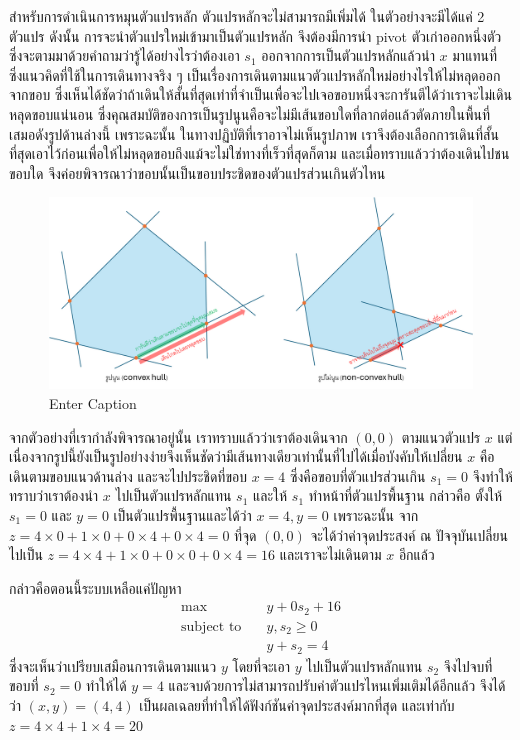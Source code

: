 สำหรับการดำเนินการหมุนตัวแปรหลัก ตัวแปรหลักจะไม่สามารถมีเพิ่มได้ ในตัวอย่างจะมีได้แค่ 2 ตัวแปร ดังนั้น การจะนำตัวแปรใหม่เข้ามาเป็นตัวแปรหลัก จึงต้องมีการนำ pivot ตัวเก่าออกหนึ่งตัว ซึ่งจะตามมาด้วยคำถามว่ารู้ได้อย่างไรว่าต้องเอา $s_1$ ออกจากการเป็นตัวแปรหลักแล้วนำ $x$ มาแทนที่
ซึ่งแนวคิดที่ใช้ในการเดินทางจริง ๆ เป็นเรื่องการเดินตามแนวตัวแปรหลักใหม่อย่างไรให้ไม่หลุดออกจากขอบ ซึ่งเห็นได้ชัดว่าถ้าเดินให้สั้นที่สุดเท่าที่จำเป็นเพื่อจะไปเจอขอบหนึ่งจะการันตีได้ว่าเราจะไม่เดินหลุดขอบแน่นอน ซึ่งคุณสมบัติของการเป็นรูปนูนคือจะไม่มีเส้นขอบใดที่ลากต่อแล้วตัดภายในพื้นที่เสมอดังรูปด้านล่างนี้
เพราะฉะนั้น ในทางปฏิบัติที่เราอาจไม่เห็นรูปภาพ เราจึงต้องเลือกการเดินที่สั้นที่สุดเอาไว้ก่อนเพื่อให้ไม่หลุดขอบถึงแม้จะไม่ใช่ทางที่เร็วที่สุดก็ตาม
และเมื่อทราบแล้วว่าต้องเดินไปชนขอบใด จึงค่อยพิจารณาว่าขอบนั้นเป็นขอบประชิดของตัวแปรส่วนเกินตัวไหน

\begin{figure}
    \centering
    \includegraphics[width=0.8\linewidth]{SimplexConvexHull.png}
    \caption{Enter Caption}
    \label{fig:enter-label}
\end{figure}

จากตัวอย่างที่เรากำลังพิจารณาอยู่นั้น เราทราบแล้วว่าเราต้องเดินจาก $(0,0)$ ตามแนวตัวแปร $x$ แต่เนื่องจากรูปนี้ยังเป็นรูปอย่างง่ายจึงเห็นชัดว่ามีเส้นทางเดียวเท่านั้นที่ไปได้เมื่อบังคับให้เปลี่ยน $x$ คือเดินตามขอบแนวด้านล่าง และจะไปประชิดที่ขอบ $x=4$ ซึ่งคือขอบที่ตัวแปรส่วนเกิน $s_1=0$ จึงทำให้ทราบว่าเราต้องนำ $x$ ไปเป็นตัวแปรหลักแทน $s_1$ และให้ $s_1$ ทำหน้าที่ตัวแปรพื้นฐาน กล่าวคือ ตั้งให้ $s_1=0$ และ $y=0$ เป็นตัวแปรพื้นฐานและได้ว่า $x=4, y=0$ เพราะฉะนั้น จาก $z=4\times 0 + 1\times0 + 0\times 4 + 0\times 4 = 0$ ที่จุด $(0,0)$ จะได้ว่าค่าจุดประสงค์ ณ ปัจจุบันเปลี่ยนไปเป็น $z=4\times 4 + 1\times0 + 0\times 0 + 0\times 4 = 16$ และเราจะไม่เดินตาม $x$ อีกแล้ว

กล่าวคือตอนนี้ระบบเหลือแค่ปัญหา
\begin{align*}
    \max  &\quad y + 0s_2 + 16 \\
    \text{subject to} &\quad y, s_2\geq0\\
                &\quad y + s_2 = 4
\end{align*}
ซึ่งจะเห็นว่าเปรียบเสมือนการเดินตามแนว $y$ โดยที่จะเอา $y$ ไปเป็นตัวแปรหลักแทน $s_2$ จึงไปจบที่ขอบที่ $s_2=0$ ทำให้ได้ $y=4$ และจบด้วยการไม่สามารถปรับค่าตัวแปรไหนเพิ่มเติมได้อีกแล้ว จึงได้ว่า $(x,y) = (4,4)$ เป็นผลเฉลยที่ทำให้ได้ฟังก์ชันค่าจุดประสงค์มากที่สุด และเท่ากับ $z = 4\times 4 + 1\times 4 = 20$

